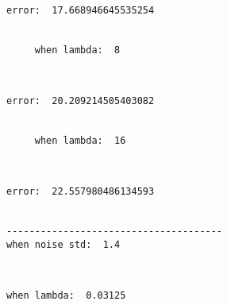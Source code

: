 \documentclass[11pt]{article}
\begin{document}
    \begin{Verbatim}[commandchars=\\\{\}]
     error:  17.668946645535254


     when lambda:  8

    \end{Verbatim}

    \begin{center}
    \end{center}
    { \hspace*{\fill} \\}
    
    \begin{Verbatim}[commandchars=\\\{\}]
     error:  20.209214505403082


     when lambda:  16

    \end{Verbatim}

    \begin{center}
    \end{center}
    { \hspace*{\fill} \\}
    
    \begin{Verbatim}[commandchars=\\\{\}]
     error:  22.557980486134593


--------------------------------------
when noise std:  1.4

    \end{Verbatim}

    \begin{center}
    \end{center}
    { \hspace*{\fill} \\}
    
    \begin{Verbatim}[commandchars=\\\{\}]
     when lambda:  0.03125

    \end{Verbatim}

    \begin{center}
    \end{center}
    { \hspace*{\fill} \\}
    
\end{document}
